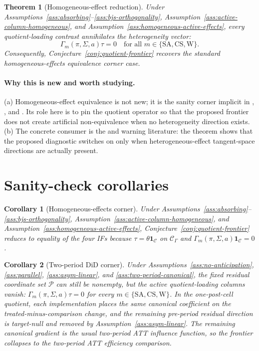 \documentclass[11pt]{article}
\theoremstyle{definition}
\theoremstyle{plain}
\newtheorem{theorem}{Theorem}
\newtheorem{corollary}{Corollary}
\theoremstyle{remark}
\begin{document}
\begin{theorem}[Homogeneous-effect reduction]\label{thm:homogeneous-reduction}
Under Assumptions~\ref{ass:absorbing}--\ref{ass:bjs-orthogonality},
Assumption~\ref{ass:active-column-homogeneous}, and
Assumption~\ref{ass:homogeneous-active-effects}, every
quotient-loading contrast annihilates the heterogeneity vector:
\[
  \Gamma_m(\pi,\Sigma,a)\tau=0\quad\text{for all }m\in\{\mathrm{SA},\mathrm{CS},\mathrm{W}\}.
\]
Consequently, Conjecture~\ref{conj:quotient-frontier} recovers the standard homogeneous-effects
equivalence corner case.
\end{theorem}
\paragraph{Why this is new and worth studying.}
(a) Homogeneous-effect equivalence is not new; it is the sanity corner implicit in
\citet{SunAbraham2021}, \citet{CallawaySantAnna2021}, and \citet{Wooldridge2021}.  Its role here is to
pin the quotient operator so that the proposed frontier does not create artificial non-equivalence
when no heterogeneity direction exists.  (b) The concrete consumer is the
\citet{GoodmanBacon2021} and \citet{deChaisemartinDHaultfoeuille2020} warning literature: the theorem
shows that the proposed diagnostic switches on only when heterogeneous-effect tangent-space directions are
actually present.

\section{Sanity-check corollaries}
\begin{corollary}[Homogeneous-effects corner]\label{cor:homogeneous}
Under Assumptions~\ref{ass:absorbing}--\ref{ass:bjs-orthogonality},
Assumption~\ref{ass:active-column-homogeneous}, and
Assumption~\ref{ass:homogeneous-active-effects}, Conjecture~\ref{conj:quotient-frontier} reduces to
equality of the four IFs because \(\tau=\theta\mathbf 1_{\mathcal C}\) on
\(\mathcal C_\Gamma\) and \(\Gamma_m(\pi,\Sigma,a)\mathbf 1_{\mathcal C}=0\).
\end{corollary}

\begin{corollary}[Two-period DiD corner]\label{cor:two-period}
Under Assumptions~\ref{ass:no-anticipation}, \ref{ass:parallel}, \ref{ass:asym-linear}, and
\ref{ass:two-period-canonical}, the fixed residual coordinate set \(\mathcal P\) can still be nonempty,
but the active quotient-loading columns vanish: \(\Gamma_m(\pi,\Sigma,a)\tau=0\) for every
\(m\in\{\mathrm{SA},\mathrm{CS},\mathrm{W}\}\).  In the one-post-cell quotient, each implementation
places the same canonical coefficient on the treated-minus-comparison change, and the remaining
pre-period residual direction is target-null and removed by Assumption~\ref{ass:asym-linear}.  The
remaining canonical gradient is the usual two-period ATT influence function, so the frontier collapses to the
\citet{SantAnnaZhao2020} two-period ATT efficiency comparison.
\end{corollary}
\end{document}
